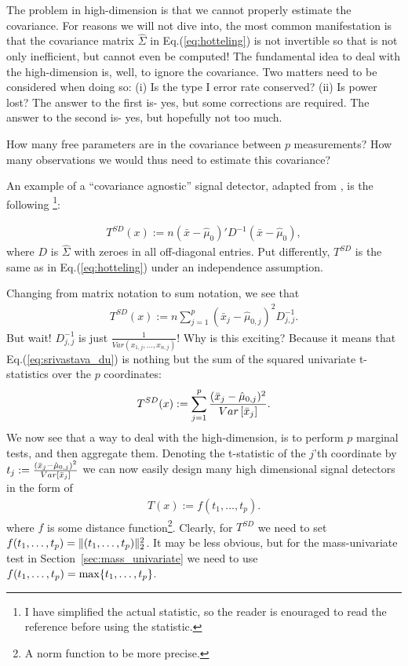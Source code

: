 The problem in high-dimension is that we cannot properly estimate the covariance. 
For reasons we will not dive into, the most common manifestation is that the covariance matrix $\hat{\Sigma}$ in Eq.(\ref{eq:hotteling}) is not invertible so that \tsq is not only inefficient, but cannot even be computed!
The fundamental idea to deal with the high-dimension is, well, to ignore the covariance.
Two matters need to be considered when doing so:
(i) Is the type I error rate conserved?
(ii) Is power lost?
The answer to the first is- yes, but some corrections are required.
The answer to the second is- yes, but hopefully not too much.

\begin{think}
How many free parameters are in the covariance between $p$ measurements?
How many observations we would thus need to estimate this covariance?
\end{think} 



An example of a ``covariance agnostic'' signal detector, adapted from \cite{srivastava_test_2008}, is the following \footnote{I have simplified the actual statistic, so the reader is enouraged to read the reference before using the statistic.}:
\begin{definition}
\begin{align}
\label{eq:srivastava_du}
	 	T^{SD}(x) := n (\bar{x}-\hat{\mu}_0)' D^{-1} (\bar{x}-\hat{\mu}_0),
\end{align}
where $D$ is $\hat{\Sigma}$ with zeroes in all off-diagonal entries. Put differently, $T^{SD}$ is the same as \tsq in Eq.(\ref{eq:hotteling}) under an independence assumption.
\end{definition}
Changing from matrix notation to sum notation, we see that 
\begin{align}
	 	T^{SD}(x) := n \sum_{j=1}^p (\bar{x}_j - \hat{\mu}_{0,j})^2 D^{-1}_{j,j} .
\end{align}
But wait! 
$D^{-1}_{j,j}$ is just $\frac{1}{Var(x_{1,j},\dots,x_{n,j})}$!
Why is this exciting? 
Because it means that Eq.(\ref{eq:srivastava_du}) is nothing but the sum of the squared univariate t-statistics over the $p$ coordinates:
\begin{align}
	 	T^{SD}(x) :=  \sum_{j=1}^p \frac{(\bar{x}_j - \hat{\mu}_{0,j})^2}{\mathop{Var} \left[ \bar{x}_j \right]}  .
\end{align}
We now see that a way to deal with the high-dimension, is to perform $p$ marginal tests, and then aggregate them.
Denoting the t-statistic of the $j$'th coordinate by $t_j:= \frac{(\bar{x}_j - \hat{\mu}_{0,j})^2}{\mathop{Var} \left[ \bar{x}_j \right]}$ we can now easily design many high dimensional signal detectors in the form of
\begin{align}
	 	T(x) :=  f(t_1,\dots,t_p) .
\end{align}
where $f$ is some distance function\footnote{A norm function to be more precise.}.
Clearly, for $T^{SD}$ we need to set $f(t_1,\dots,t_p) = \Vert (t_1,\dots,t_p) \Vert_2^2$.
It may be less obvious, but for the mass-univariate test in Section~\ref{sec:mass_univariate} we need to use $f(t_1,\dots,t_p)=\max\{ t_1,\dots,t_p \}$.



